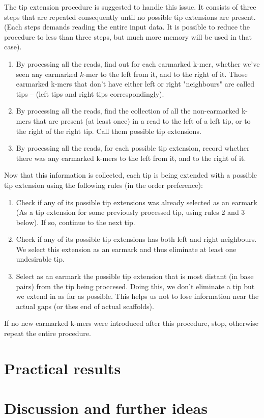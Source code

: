 \documentclass[12pt]{article}
\begin{document}
The tip extension procedure is suggested to handle this issue.
It consists of three steps that are repeated consequently until no possible tip extensions are present.
(Each steps demands reading the entire input data. It is possible to reduce the procedure to less than three
steps, but much more memory will be used in that case).

\begin{enumerate}
\item By processing all the reads, find out for each earmarked k-mer, whether we've seen any
earmarked $k$-mer to the left from it, and to the right of it.
Those earmarked k-mers that don't have either left or right "neighbours" are called tips --
(left tips and right tips correspondingly).
\item By processing all the reads, find the collection of all the non-earmarked k-mers that
are present (at least once) in a read to the left of a left tip, or to the right of the right tip.
Call them possible tip extensions.
\item By processing all the reads, for each possible tip extension, record whether there was
any earmarked k-mers to the left from it, and to the right of it.
\end{enumerate}

Now that this information is collected, each tip is being extended with
a possible tip extension using the following rules (in the order preference):

\begin{enumerate}
\item Check if any of its possible tip extensions was already selected as an earmark
(As a tip extension for some previously processed tip, using rules 2 and 3 below).
If so, continue to the next tip.
\item Check if any of its possible tip extensions has both left and right neighbours.
We select this extension as an earmark and thus eliminate at least one undesirable tip.
\item Select as an earmark the possible tip extension that is most distant (in base pairs)
from the tip being proccesed. Doing this, we don't eliminate a tip but we extend in as far
as possible. This helps us not to lose information near the actual gaps (or thes end of actual scaffolds).
\end{enumerate}

If no new earmarked k-mers were introduced after this procedure, stop, otherwise repeat the entire procedure.

\section{Practical results}



\section{Discussion and further ideas}




\end{document}
